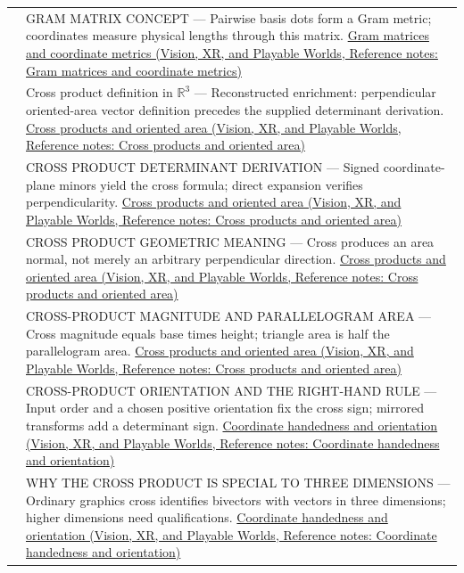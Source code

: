 {\begin{longtable}[]{@{}
  >{\raggedright\arraybackslash}p{}
  >{\raggedright\arraybackslash}p{}@{}}
541 & GRAM MATRIX CONCEPT --- Pairwise basis dots form a Gram metric; coordinates measure physical lengths through this matrix. \href{../07-Vision-XR-and-Playable-Worlds/main.pdf\#nameddest=appendix-3b863809f82a}{Gram matrices and coordinate metrics (Vision, XR, and Playable Worlds, Reference notes: Gram matrices and coordinate metrics)} \\
542 & Cross product definition in \(\mathbb R^3\) --- Reconstructed enrichment: perpendicular oriented-area vector definition precedes the supplied determinant derivation. \href{../07-Vision-XR-and-Playable-Worlds/main.pdf\#nameddest=appendix-2391db8052b1}{Cross products and oriented area (Vision, XR, and Playable Worlds, Reference notes: Cross products and oriented area)} \\
543 & CROSS PRODUCT DETERMINANT DERIVATION --- Signed coordinate-plane minors yield the cross formula; direct expansion verifies perpendicularity. \href{../07-Vision-XR-and-Playable-Worlds/main.pdf\#nameddest=appendix-2391db8052b1}{Cross products and oriented area (Vision, XR, and Playable Worlds, Reference notes: Cross products and oriented area)} \\
544 & CROSS PRODUCT GEOMETRIC MEANING --- Cross produces an area normal, not merely an arbitrary perpendicular direction. \href{../07-Vision-XR-and-Playable-Worlds/main.pdf\#nameddest=appendix-2391db8052b1}{Cross products and oriented area (Vision, XR, and Playable Worlds, Reference notes: Cross products and oriented area)} \\
545 & CROSS-PRODUCT MAGNITUDE AND PARALLELOGRAM AREA --- Cross magnitude equals base times height; triangle area is half the parallelogram area. \href{../07-Vision-XR-and-Playable-Worlds/main.pdf\#nameddest=appendix-2391db8052b1}{Cross products and oriented area (Vision, XR, and Playable Worlds, Reference notes: Cross products and oriented area)} \\
546 & CROSS-PRODUCT ORIENTATION AND THE RIGHT-HAND RULE --- Input order and a chosen positive orientation fix the cross sign; mirrored transforms add a determinant sign. \href{../07-Vision-XR-and-Playable-Worlds/main.pdf\#nameddest=appendix-87d7626c8d37}{Coordinate handedness and orientation (Vision, XR, and Playable Worlds, Reference notes: Coordinate handedness and orientation)} \\
547 & WHY THE CROSS PRODUCT IS SPECIAL TO THREE DIMENSIONS --- Ordinary graphics cross identifies bivectors with vectors in three dimensions; higher dimensions need qualifications. \href{../07-Vision-XR-and-Playable-Worlds/main.pdf\#nameddest=appendix-87d7626c8d37}{Coordinate handedness and orientation (Vision, XR, and Playable Worlds, Reference notes: Coordinate handedness and orientation)} \\

\end{longtable}}
